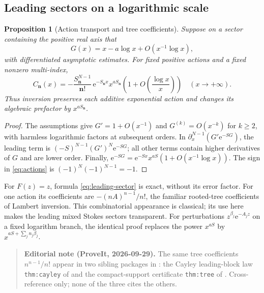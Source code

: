 \documentclass[11pt,a4paper]{article}
\numberwithin{equation}{section}
\newtheorem{proposition}[theorem]{Proposition}
\theoremstyle{definition}
\theoremstyle{remark}
\newcommand{\e}{\mathrm e}
\newcommand{\bn}{\boldsymbol n}
\begin{document}
\subsection{Leading sectors on a logarithmic scale}
\begin{proposition}[Action transport and tree coefficients]
\label{prop:leading}
Suppose on a sector containing the positive real axis that
\begin{equation}
 G(x)=x-a\log x+O(x^{-1}\log x),
 \label{eq:Gleading}
\end{equation}
with differentiated asymptotic estimates. For fixed positive actions and a fixed nonzero multi-index,
\begin{equation}
 C_{\bn}(x)=
 -\frac{S_{\bn}^{N-1}}{\bn!}\,
 \e^{-S_{\bn}x}x^{aS_{\bn}}
 \left(1+O\left(\frac{\log x}{x}\right)\right)
 \quad(x\to+\infty).
 \label{eq:leading-sector}
\end{equation}
Thus inversion preserves each additive exponential action and changes its algebraic prefactor by $x^{aS_{\bn}}$.
\end{proposition}
\begin{proof}
The assumptions give $G'=1+O(x^{-1})$ and $G^{(k)}=O(x^{-k})$ for $k\geq2$, with harmless logarithmic factors at subsequent orders. In $\partial_x^{N-1}(G'\e^{-SG})$, the leading term is
$(-S)^{N-1}(G')^N\e^{-SG}$; all other terms contain higher derivatives of $G$ and are lower order. Finally,
$\e^{-SG}=\e^{-Sx}x^{aS}(1+O(x^{-1}\log x))$. The sign in \eqref{eq:actions} is
$(-1)^N(-1)^{N-1}=-1$.
\end{proof}

For $F(z)=z$, formula \eqref{eq:leading-sector} is exact, without its error factor. For one action its coefficients are
$-(nA)^{n-1}/n!$, the familiar rooted-tree coefficients of Lambert inversion. This combinatorial appearance is classical; its use here makes the leading mixed Stokes sectors transparent. For perturbations $z^{\beta_j}\e^{-A_jz}$ on a fixed logarithm branch, the identical proof replaces the power $x^{aS}$ by $x^{aS+\sum_jn_j\beta_j}$.

\begin{quote}\small\textbf{Editorial note (ProveIt, 2026-09-29).} The same tree coefficients $n^{n-1}/n!$ appear in two sibling packages in : the Cayley leading-block law \texttt{thm:cayley} of  and the compact-support certificate \texttt{thm:tree} of . Cross-reference only; none of the three cites the others.\end{quote}
\end{document}
